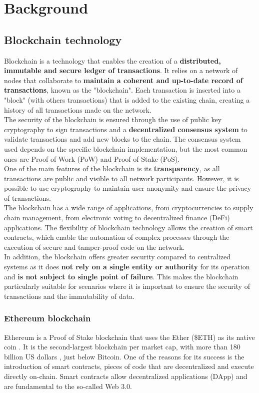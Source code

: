\section{Background}\label{sec:background}

\subsection{Blockchain technology}
Blockchain is a technology that enables the creation of a \textbf{distributed, immutable and secure ledger of transactions}. It relies on a network of nodes that collaborate to \textbf{maintain a coherent and up-to-date record of transactions}, known as the "blockchain". Each transaction is inserted into a "block" (with others transactions) that is added to the existing chain, creating a history of all transactions made on the network.
\\
\indent The security of the blockchain is ensured through the use of public key cryptography to sign transactions and a \textbf{decentralized consensus system} to validate transactions and add new blocks to the chain. The consensus system used depends on the specific blockchain implementation, but the most common ones are Proof of Work (PoW) and Proof of Stake (PoS).
\\
\indent One of the main features of the blockchain is its \textbf{transparency}, as all transactions are public and visible to all network participants. However, it is possible to use cryptography to maintain user anonymity and ensure the privacy of transactions.
\\
\indent The blockchain has a wide range of applications, from cryptocurrencies to supply chain management, from electronic voting to decentralized finance (DeFi) applications. The flexibility of blockchain technology allows the creation of smart contracts, which enable the automation of complex processes through the execution of secure and tamper-proof code on the network.
\\
\indent In addition, the blockchain offers greater security compared to centralized systems as it does \textbf{not rely on a single entity or authority} for its operation and \textbf{is not subject to single point of failure}. This makes the blockchain particularly suitable for scenarios where it is important to ensure the security of transactions and the immutability of data.

\subsubsection{Ethereum blockchain}
Ethereum is a Proof of Stake blockchain that uses the Ether (\$ETH) as its native coin \cite{whitepaper}. It is the second-largest blockchain per market cap, with more than 180 billion US dollars \cite{coinmarketcap}, just below Bitcoin. One of the reasons for its success is the introduction of smart contracts, pieces of code that are decentralized and execute directly on-chain. Smart contracts allow decentralized applications (DApp) and are fundamental to the so-called Web 3.0.

